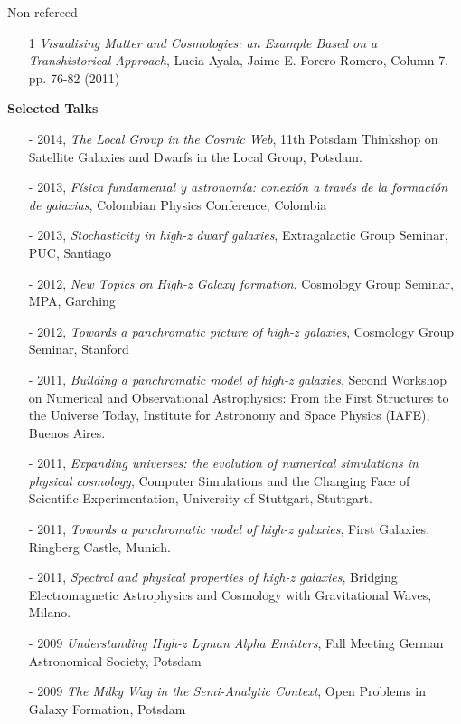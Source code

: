 \documentclass[letterpaper,11pt,onecolumn]{article}
\begin{document}
Non refereed 
\begin{enumerate}
\item[1] {\it Visualising Matter and Cosmologies: an Example Based on
  a Transhistorical Approach}, Lucia Ayala, Jaime E. Forero-Romero,
  Column 7, pp. 76-82 (2011) 
\end{enumerate}


{\bf Selected Talks}
\begin{itemize} 
\item [-] 2014, {\it The Local Group in the Cosmic Web}, 11th Potsdam
  Thinkshop on Satellite Galaxies and Dwarfs in the Local Group,
  Potsdam.
\item [-] 2013, {\it F\'isica fundamental y astronom\'ia: conexi\'on a trav\'es de la formaci\'on de galaxias}, Colombian Physics Conference, Colombia
\item [-] 2013, {\it Stochasticity in high-z dwarf galaxies},
  Extragalactic Group Seminar, PUC, Santiago
\item [-] 2012, {\it New Topics on High-z Galaxy formation}, Cosmology
  Group Seminar, MPA, Garching 
\item [-] 2012, {\it Towards a panchromatic picture of high-z
  galaxies}, Cosmology Group Seminar, Stanford 
\item [-] 2011, {\it Building a panchromatic model of high-z
  galaxies}, Second Workshop on Numerical and Observational
  Astrophysics: From the First Structures to the Universe Today,
  Institute for Astronomy and Space Physics (IAFE), Buenos Aires. 
\item [-] 2011, {\it Expanding universes: the evolution of numerical
  simulations in physical cosmology}, Computer Simulations and the
  Changing Face of Scientific Experimentation, University of
  Stuttgart, Stuttgart. 
\item [-] 2011, {\it Towards a panchromatic model of high-z galaxies}, First
  Galaxies, Ringberg Castle, Munich.  
\item [-] 2011, {\it Spectral and physical properties of high-z galaxies},
  Bridging Electromagnetic Astrophysics and Cosmology with Gravitational
  Waves, Milano.
\item [-] 2009 {\it Understanding High-z Lyman Alpha Emitters}, Fall
  Meeting German Astronomical Society, Potsdam 
\item [-] 2009 {\it The Milky Way in the Semi-Analytic Context}, Open
  Problems in Galaxy Formation, Potsdam 

\end{itemize}
\end{document}
